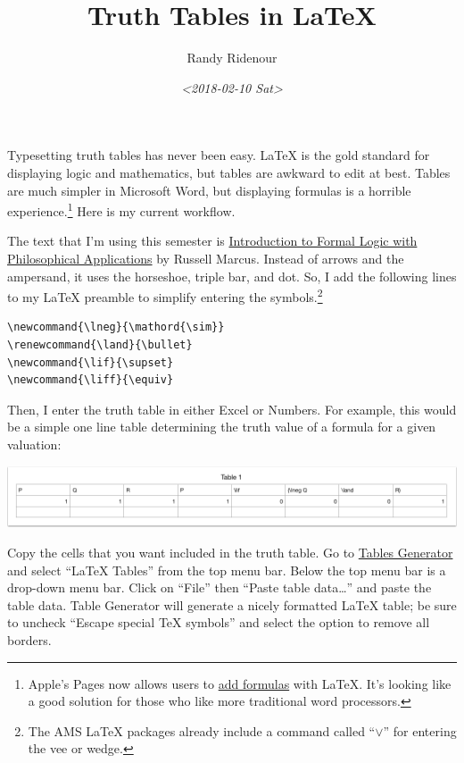 \documentclass[11pt]{article}
\author{Randy Ridenour}
\date{\textit{<2018-02-10 Sat>}}
\title{Truth Tables in \LaTeX{}}
\begin{document}
\maketitle
Typesetting truth tables has never been easy. \LaTeX{} is the gold standard for displaying logic and mathematics, but tables are awkward to edit at best. Tables are much simpler in Microsoft Word, but displaying formulas is a horrible experience.\footnote{Apple's Pages now allows users to \href{https://support.apple.com/en-us/HT207569}{add formulas} with \LaTeX{}. It's looking like a good solution for those who like more traditional word processors.}
Here is my current workflow.

The text that I'm using this semester is \href{https://global.oup.com/ushe/product/introduction-to-formal-logic-with-philosophical-applications-9780199386482?cc=us\&lang=en\&}{Introduction to Formal Logic with Philosophical Applications} by Russell Marcus. Instead of arrows and the ampersand, it uses the horseshoe, triple bar, and dot. So, I add the following lines to my \LaTeX{} preamble to simplify entering the symbols.\footnote{The AMS \LaTeX{} packages already include a command called ``\(\lor\)'' for entering the vee or wedge.}


\begin{verbatim}
\newcommand{\lneg}{\mathord{\sim}}
\renewcommand{\land}{\bullet}
\newcommand{\lif}{\supset}
\newcommand{\liff}{\equiv}
\end{verbatim}


Then, I enter the truth table in either Excel or Numbers. For example, this would be a simple one line table determining the truth value of a formula for a given valuation:

\begin{center}
\begin{center}
\includegraphics[width=.9\linewidth]{../images/posts/20180210-numbers-truth-table1.png}
\end{center}
\end{center}

Copy the cells that you want included in the truth table. Go to \href{http://www.tablesgenerator.com}{Tables Generator} and select ``\LaTeX{} Tables'' from the top menu bar. Below the top menu bar is a drop-down menu bar. Click on ``File'' then ``Paste table data\ldots{}'' and paste the table data. Table Generator will generate a nicely formatted \LaTeX{} table; be sure to uncheck ``Escape special \TeX{} symbols'' and select the option to remove all borders.
\end{document}
